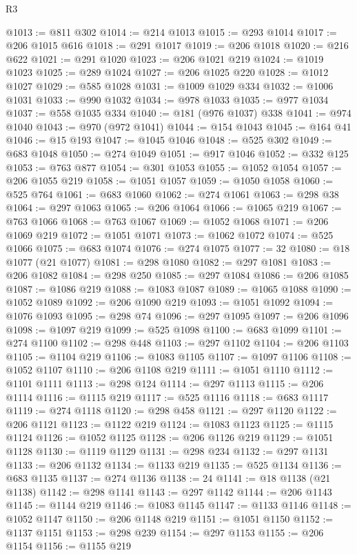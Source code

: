 \begin{lexlean}{R3}
\begin{coremodule}
@1013 := @811 @302
@1014 := @214 @1013
@1015 := @293 @1014
@1017 := @206 @1015 @616
@1018 := @291 @1017
@1019 := @206 @1018
@1020 := @216 @622
@1021 := @291 @1020
@1023 := @206 @1021 @219
@1024 := @1019 @1023
@1025 := @289 @1024
@1027 := @206 @1025 @220
@1028 := @1012 @1027
@1029 := @585 @1028
@1031 := @1009 @1029 @334
@1032 := @1006 @1031
@1033 := @990 @1032
@1034 := @978 @1033
@1035 := @977 @1034
@1037 := @558 @1035 @334
@1040 := @181 (@976 @1037) @338
@1041 := @974 @1040
@1043 := @970 (@972 @1041)
@1044 := @154 @1043
@1045 := @164 @41
@1046 := @15 @193
@1047 := @1045 @1046
@1048 := @525 @302
@1049 := @683 @1048
@1050 := @274 @1049
@1051 := @917 @1046
@1052 := @332 @125
@1053 := @763 @877
@1054 := @301 @1053
@1055 := @1052 @1054
@1057 := @206 @1055 @219
@1058 := @1051 @1057
@1059 := @1050 @1058
@1060 := @525 @764
@1061 := @683 @1060
@1062 := @274 @1061
@1063 := @298 @38
@1064 := @297 @1063
@1065 := @206 @1064
@1066 := @1065 @219
@1067 := @763 @1066
@1068 := @763 @1067
@1069 := @1052 @1068
@1071 := @206 @1069 @219
@1072 := @1051 @1071
@1073 := @1062 @1072
@1074 := @525 @1066
@1075 := @683 @1074
@1076 := @274 @1075
@1077 := 32
@1080 := @18 @1077 (@21 @1077)
@1081 := @298 @1080
@1082 := @297 @1081
@1083 := @206 @1082
@1084 := @298 @250
@1085 := @297 @1084
@1086 := @206 @1085
@1087 := @1086 @219
@1088 := @1083 @1087
@1089 := @1065 @1088
@1090 := @1052 @1089
@1092 := @206 @1090 @219
@1093 := @1051 @1092
@1094 := @1076 @1093
@1095 := @298 @74
@1096 := @297 @1095
@1097 := @206 @1096
@1098 := @1097 @219
@1099 := @525 @1098
@1100 := @683 @1099
@1101 := @274 @1100
@1102 := @298 @448
@1103 := @297 @1102
@1104 := @206 @1103
@1105 := @1104 @219
@1106 := @1083 @1105
@1107 := @1097 @1106
@1108 := @1052 @1107
@1110 := @206 @1108 @219
@1111 := @1051 @1110
@1112 := @1101 @1111
@1113 := @298 @124
@1114 := @297 @1113
@1115 := @206 @1114
@1116 := @1115 @219
@1117 := @525 @1116
@1118 := @683 @1117
@1119 := @274 @1118
@1120 := @298 @458
@1121 := @297 @1120
@1122 := @206 @1121
@1123 := @1122 @219
@1124 := @1083 @1123
@1125 := @1115 @1124
@1126 := @1052 @1125
@1128 := @206 @1126 @219
@1129 := @1051 @1128
@1130 := @1119 @1129
@1131 := @298 @234
@1132 := @297 @1131
@1133 := @206 @1132
@1134 := @1133 @219
@1135 := @525 @1134
@1136 := @683 @1135
@1137 := @274 @1136
@1138 := 24
@1141 := @18 @1138 (@21 @1138)
@1142 := @298 @1141
@1143 := @297 @1142
@1144 := @206 @1143
@1145 := @1144 @219
@1146 := @1083 @1145
@1147 := @1133 @1146
@1148 := @1052 @1147
@1150 := @206 @1148 @219
@1151 := @1051 @1150
@1152 := @1137 @1151
@1153 := @298 @239
@1154 := @297 @1153
@1155 := @206 @1154
@1156 := @1155 @219

\end{coremodule}
\end{lexlean}
